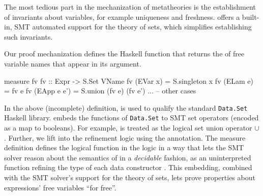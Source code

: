 The most tedious part in the mechanization of metatheories
is the establishment of invariants about variables,
for example uniqueness and freshness.
%
\lh offers a built-in, SMT automated support for the
theory of sets, which simplifies establishing such
invariants.

\begin{fullversion}
  Our proof mechanization defines the Haskell function
   that returns the  of free variable names
  that appear in its argument.
  \begin{mcode}
  measure fv
  fv :: Expr -> S.Set VName
  fv (EVar x)    = S.singleton x
  fv (ELam e)    = fv e
  fv (EApp e e') = S.union (fv e) (fv e')
  ... -- other cases
  \end{mcode}
  In the above (incomplete) definition, 
  is used to qualify the standard \verb+Data.Set+ Haskell library.
  \lh embeds the functions of \verb+Data.Set+ to SMT
  set operators (encoded as a map to booleans).
  For example,  is treated as the
  logical set union operator $\cup$.
  Further, we lift  into the refinement
  logic using the  annotation.
  The measure definition  defines the logical
  function  in the logic in a way that
  lets the SMT solver reason about the semantics
  of  in a \textit{decidable} fashion,
  as an uninterpreted function refining the
  type of each  data constructor
  \cite{sprite}.
  This embedding, combined with the SMT solver's
  support for the theory of sets, lets \lh prove
  properties about expressions' free variables
  ``for free''.
\end{fullversion}


